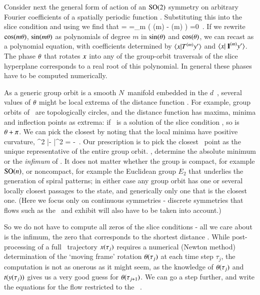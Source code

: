 Consider next the general form  of action of an
$\textrm{SO}(2)$ symmetry on arbitrary Fourier coefficients of a spatially
periodic function . Substituting this into the slice
condition  and using  we find that
\bea
{}
=
\continue
=\sum\limits_m
   \left(
     \cos(m\gSpace)
  -  \sin(m\gSpace)
   \right)
   =0
\,.
\label{eq:so2sing}
\eea
If we rewrite $\cos(m{\bf \theta})$, $\sin(m{\bf \theta})$ as polynomials of degree
$m$ in $\sin({\bf \theta})$ and $\cos({\bf \theta})$, we can recast
 as a polynomial equation, with coefficients determined
by $\braket{\ssp}{\Lg^{(m)} \slicep}$ and
$\braket{\ssp}{\id^{(m)}\slicep}$. The phase ${\bf \theta}$ that rotates
$x$ into any of the group-orbit traversals of the slice hyperplane
corresponds to a real root of this polynomial. In general these phases have to
be computed numerically.

As a generic group orbit is a smooth $N$\dmn\ manifold embedded in the
$d$\dmn\ \statesp, several values of ${\bf \theta}$ might be local extrema of
the distance function . For example, group orbits of
\ are topologically circles, and the distance function
 has maxima, minima and inflection points as extrema:
if \gSpace\ is a solution of the slice condition ,
so is ${\bf \theta}+\pi$. We can pick the closest by noting that
the local minima have positive curvature,
\beq
{}
     {\partial \gSpace^2}
        |\sspRed - \slicep|^2
    =
-  \braket{\sspRed}{\Lg^2\slicep}
\,.
Our prescription is to pick the closest \reducedsp\ point as the unique
representative of the entire group orbit. \ie, determine the absolute
minimum or the \emph{infimum} of . It does not matter
whether the group is compact, for example $\textrm{SO}(n)$, or noncompact, for
example the Euclidean group $E_2$ that underlies the generation of spiral
patterns; in either case any group orbit has one or several
locally closest passages to the {\template} state, and generically only
one that is the closest one.
(Here we focus only on continuous symmetries - discrete symmetries that
flows such as the \KS\ and {\pCf} exhibit will also have to be taken into
account.)

So we do not have to compute all zeros of the slice conditions
 - all we care about is the infimum, the zero that
corresponds to the shortest distance .
While post-processing of a full \statesp\ trajectory $x(\tau_j)$
requires a numerical (Newton method) determination of the
`moving frame' rotation
${\bf \theta}(\tau_j)$ at each time step $\tau_j$, the computation is not
as onerous as it might seem, as the knowledge of ${\bf \theta}(\tau_j)$ and
$t(y(\tau_j))$
gives us a very good guess for ${\bf \theta}(\tau_{j+1})$. We
can go a step further, and write the equations for the flow restricted to
the \reducedsp\ \pSRed.

%
